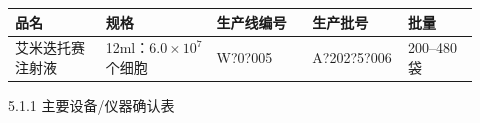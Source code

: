 \documentclass[UTF8,10pt,a4paper,fontset=fandol]{ctexart}
\newcommand{\fieldvalue}[1]{#1}
\newcommand{\handwritten}[1]{#1}
\begin{document}
\begin{tabular}{|p{0.18\linewidth}|p{0.22\linewidth}|p{0.19\linewidth}|p{0.19\linewidth}|p{0.14\linewidth}|}
\hline
品名 & 规格 & 生产线编号 & 生产批号 & 批量 \\ \hline
\fieldvalue{艾米迭托赛注射液} &
\fieldvalue{12ml：$6.0\times10^{7}$个细胞} &
\fieldvalue{\handwritten{W?0?005}} &
\fieldvalue{\handwritten{A?202?5?006}} &
\fieldvalue{200--480袋}
\\ \hline
\end{tabular}

\medskip

5.1.1 主要设备/仪器确认表
\end{document}
